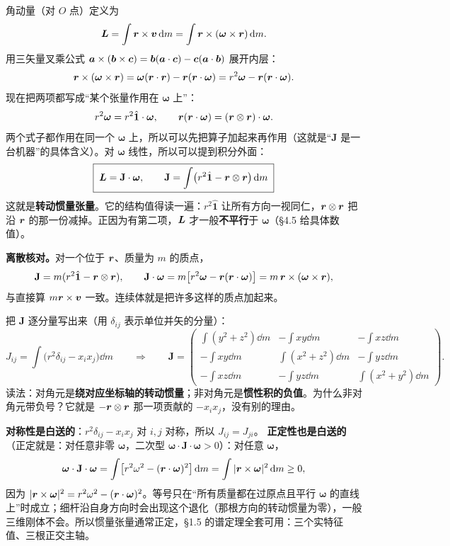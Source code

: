 \documentclass[11pt]{ctexart}
\newcommand{\ten}[1]{\mathbf{#1}}
\newcommand{\unitd}{\hat{\ten{1}}}
\let\origsubhdr\subhdr
\renewcommand{\subhdr}[1]{\par\needspace{3\baselineskip}\origsubhdr{#1}}
\begin{document}
角动量（对 $O$ 点）定义为
\[
\boldsymbol{L}=\int\boldsymbol{r}\times\boldsymbol{v}\,\mathrm{d} m
=\int\boldsymbol{r}\times(\boldsymbol\omega\times\boldsymbol{r})\,\mathrm{d} m .
\]
用三矢量叉乘公式 $\boldsymbol{a}\times(\boldsymbol{b}\times\boldsymbol{c})=\boldsymbol{b}(\boldsymbol{a}\cdot\boldsymbol{c})-\boldsymbol{c}(\boldsymbol{a}\cdot\boldsymbol{b})$ 展开内层：
\[
\boldsymbol{r}\times(\boldsymbol\omega\times\boldsymbol{r})
=\boldsymbol\omega(\boldsymbol{r}\cdot\boldsymbol{r})-\boldsymbol{r}(\boldsymbol{r}\cdot\boldsymbol\omega)
=r^2\boldsymbol\omega-\boldsymbol{r}(\boldsymbol{r}\cdot\boldsymbol\omega).
\]
现在把两项都写成“某个张量作用在 $\boldsymbol\omega$ 上”：
\[
r^2\boldsymbol\omega=r^2\unitd\cdot\boldsymbol\omega,
\qquad
\vect r(\vect r\cdot\boldsymbol\omega)=(\vect r\otimes\vect r)\cdot\boldsymbol\omega .
\]
两个式子都作用在同一个 $\boldsymbol\omega$ 上，所以可以先把算子加起来再作用（这就是“$\ten J$ 是一台机器”的具体含义）。对 $\boldsymbol\omega$ 线性，所以可以提到积分外面：
\[
\boxed{\;\vect L=\ten J\cdot\boldsymbol\omega,\qquad
\ten J=\int\bigl(r^2\unitd-\vect r\otimes\vect r\bigr)\dd m\;}
\]
这就是\textbf{转动惯量张量}。它的结构值得读一遍：$r^2\unitd$ 让所有方向一视同仁，$\boldsymbol{r}\otimes\boldsymbol{r}$ 把沿 $\boldsymbol{r}$ 的那一份减掉。正因为有第二项，$\boldsymbol{L}$ 才一般\textbf{不平行}于 $\boldsymbol\omega$（§4.5 给具体数值）。

\textbf{离散核对。}对一个位于 $\boldsymbol{r}$、质量为 $m$ 的质点，
\[
\ten J=m(r^2\unitd-\vect r\otimes\vect r),
\qquad
\ten J\cdot\boldsymbol\omega=m\bigl[r^2\boldsymbol\omega-\vect r(\vect r\cdot\boldsymbol\omega)\bigr]=m\,\vect r\times(\boldsymbol\omega\times\vect r),
\]
与直接算 $m\boldsymbol{r}\times\boldsymbol{v}$ 一致。连续体就是把许多这样的质点加起来。


把 $\ten J$ 逐分量写出来（用 $\delta_{ij}$ 表示单位并矢的分量）：
\[
J_{ij}=\int\bigl(r^2\delta_{ij}-x_ix_j\bigr)\dd m
\qquad\Longrightarrow\qquad
\ten J=
\begin{pmatrix}
\int(y^2+z^2)\dd m & -\int xy\dd m & -\int xz\dd m\\[3pt]
-\int xy\dd m & \int(x^2+z^2)\dd m & -\int yz\dd m\\[3pt]
-\int xz\dd m & -\int yz\dd m & \int(x^2+y^2)\dd m
\end{pmatrix}.
\]
读法：对角元是\textbf{绕对应坐标轴的转动惯量}；非对角元是\textbf{惯性积的负值}。为什么非对角元带负号？它就是 $-\boldsymbol{r}\otimes\boldsymbol{r}$ 那一项贡献的 $-x_ix_j$，没有别的理由。

\textbf{对称性是白送的}：$r^2\delta_{ij}-x_ix_j$ 对 $i,j$ 对称，所以 $J_{ij}=J_{ji}$。
\textbf{正定性也是白送的}（正定就是：对任意非零 $\boldsymbol\omega$，二次型 $\boldsymbol\omega\cdot\ten J\cdot\boldsymbol\omega>0$）：对任意 $\boldsymbol\omega$，
\[
\boldsymbol\omega\cdot\ten J\cdot\boldsymbol\omega
=\int\bigl[r^2\omega^2-(\vect r\cdot\boldsymbol\omega)^2\bigr]\dd m
=\int|\vect r\times\boldsymbol\omega|^2\dd m\ge0,
\]
因为 $|\boldsymbol{r}\times\boldsymbol\omega|^2=r^2\omega^2-(\boldsymbol{r}\cdot\boldsymbol\omega)^2$。等号只在“所有质量都在过原点且平行 $\boldsymbol\omega$ 的直线上”时成立；细杆沿自身方向时会出现这个退化（那根方向的转动惯量为零），一般三维刚体不会。所以惯量张量通常正定，§1.5 的谱定理全套可用：三个实特征值、三根正交主轴。
\end{document}
